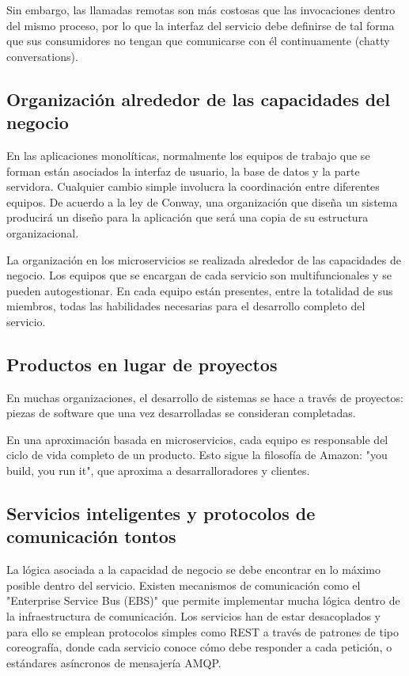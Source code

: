 \documentclass[11pt,a4paper]{article}
\begin{document}
Sin embargo, las llamadas remotas son más costosas que las invocaciones dentro del mismo proceso, por lo que la interfaz del servicio debe definirse de tal forma que sus consumidores no tengan que comunicarse con él continuamente (chatty conversations).

\subsection{Organización alrededor de las capacidades del negocio}

En las aplicaciones monolíticas, normalmente los equipos de trabajo que se forman están asociados la interfaz de usuario, la base de datos y la parte servidora. Cualquier cambio simple involucra la coordinación entre diferentes equipos. De acuerdo a la ley de Conway, una organización que diseña un sistema producirá un diseño para la aplicación que será una copia de su estructura organizacional.

La organización en los microservicios se realizada alrededor de las capacidades de negocio. Los equipos que se encargan de cada servicio son multifuncionales y se pueden autogestionar. En cada equipo están presentes, entre la totalidad de sus miembros, todas las habilidades necesarias para el desarrollo completo del servicio. 

\subsection{Productos en lugar de proyectos}

En muchas organizaciones, el desarrollo de sistemas se hace a través de proyectos: piezas de software que una vez desarrolladas se consideran completadas.

En una aproximación basada en microservicios, cada equipo es responsable del ciclo de vida completo de un producto. Esto sigue la filosofía de Amazon: "you build, you run it", que aproxima a desarralloradores y clientes.

\subsection{Servicios inteligentes y protocolos de comunicación tontos}

La lógica asociada a la capacidad de negocio se debe encontrar en lo máximo posible dentro del servicio. Existen mecanismos de comunicación como el "Enterprise Service Bus (EBS)" que permite implementar mucha lógica dentro de la infraestructura de comunicación. Los servicios han de estar desacoplados y para ello se emplean protocolos simples como REST a través de patrones de tipo coreografía, donde cada servicio conoce cómo debe responder a cada petición, o estándares asíncronos de mensajería AMQP.
\end{document}
